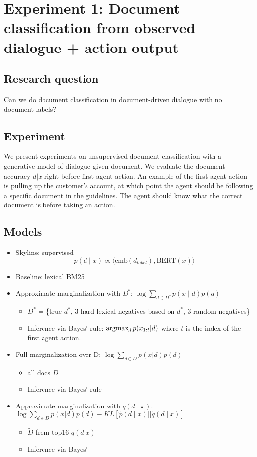 \documentclass[11pt]{article}
\begin{document}



\appendix

\section{Experiment 1: Document classification from observed dialogue + action output}
\subsection{Research question}
Can we do document classification in document-driven dialogue with no document labels?

\subsection{Experiment}
We present experiments on
unsupervised document classification with a generative model of dialogue given document.
We evaluate the document accuracy $d|x$ right before first agent action.
An example of the first agent action is pulling up the customer's account,
at which point the agent should be following a specific document in the guidelines.
The agent should know what the correct document is before taking an action.

\subsection{Models}
\begin{itemize}
\item Skyline: supervised $$p(d \mid x) \propto \langle \text{emb}(d_{label}), \text{BERT}(x)\rangle$$
\item Baseline: lexical BM25
\item Approximate marginalization with $D^*$: $\log\sum_{d\in D^*} p(x\mid d) p(d)$
    \begin{itemize}
    \item $D^*$ = \{true $d^*$, 3 hard lexical negatives based on $d^*$, 3 random negatives\}
    \item Inference via Bayes' rule: $\operatorname*{argmax}_d p(x_{1:t}|d)$ where $t$ is the index
        of the first agent action.
    \end{itemize}
\item Full marginalization over D: $\log\sum_{d\in D} p(x|d)p(d)$
    \begin{itemize}
    \item all docs $D$
    \item Inference via Bayes' rule
    \end{itemize}
\item Approximate marginalization with $q(d\mid x)$:
    $\log\sum_{d\in \tilde{D}} p(x|d)p(d) - KL[\tilde{p}(d\mid x)||\tilde{q}(d\mid x)]$
    \begin{itemize}
    \item $\tilde{D}$ from top16 $q(d|x)$
    \item Inference via Bayes'
    \end{itemize}
\end{itemize}
\end{document}
